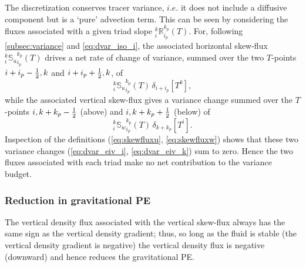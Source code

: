 \documentclass[../main/NEMO_manual]{subfiles}
\begin{document}
The discretization conserves tracer variance, $i.e.$ it does not include a diffusive component but is a `pure' advection term.
This can be seen %
by considering the fluxes associated with a given triad slope $_i^k{\mathbb{R}}_{i_p}^{k_p} (T)$.
For, following \autoref{subsec:variance} and \autoref{eq:dvar_iso_i},
the associated horizontal skew-flux $_i^k{\mathbb{S}_u}_{i_p}^{k_p} (T)$ drives a net rate of change of variance,
summed over the two $T$-points $i+i_p-\textstyle\frac{1}{2},k$ and $i+i_p+\textstyle\frac{1}{2},k$, of
\begin{equation}
  \label{eq:dvar_eiv_i}
  _i^k{\mathbb{S}_u}_{i_p}^{k_p} (T)\,\delta_{i+ i_p}[T^k],
\end{equation}
while the associated vertical skew-flux gives a variance change summed over
the $T$-points $i,k+k_p-\textstyle\frac{1}{2}$ (above) and $i,k+k_p+\textstyle\frac{1}{2}$ (below) of
\begin{equation}
  \label{eq:dvar_eiv_k}
  _i^k{\mathbb{S}_w}_{i_p}^{k_p} (T) \,\delta_{k+ k_p}[T^i].
\end{equation}
Inspection of the definitions (\autoref{eq:skewfluxu}, \autoref{eq:skewfluxw}) shows that
these two variance changes (\autoref{eq:dvar_eiv_i}, \autoref{eq:dvar_eiv_k}) sum to zero.
Hence the two fluxes associated with each triad make no net contribution to the variance budget.

\subsubsection{Reduction in gravitational PE}

The vertical density flux associated with the vertical skew-flux always has the same sign as
the vertical density gradient;
thus, so long as the fluid is stable (the vertical density gradient is negative)
the vertical density flux is negative (downward) and hence reduces the gravitational PE.
\end{document}
